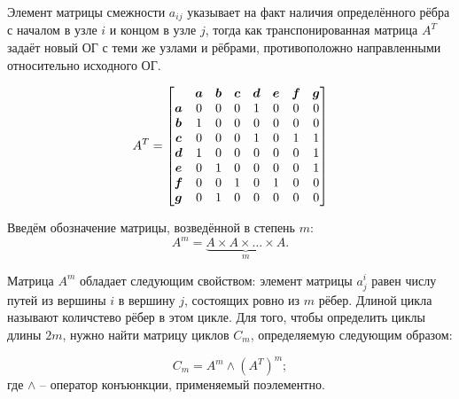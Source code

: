 Элемент матрицы смежности $a_{ij}$ указывает на факт наличия определённого рёбра с началом в узле $i$ и концом в узле $j$, тогда как транспонированная матрица $A^T$ задаёт новый ОГ с теми же узлами и рёбрами, противоположно направленными относительно исходного ОГ.

\begin{equation}\label{eq.rndhpcpar.2021.11.14.02}
	A^T=%
	\begin{bmatrix}
		&	\bs{a}	&	\bs{b}	&	\bs{c}	&	\bs{d}	&	\bs{e}	&	\bs{f}	&	\bs{g} \\
	\bs{a}	&	0	&	0	&	0	& 	1	& 	0	& 	0	 & 	0 \\
	\bs{b}	&	1	&	0	&	0	& 	0	& 	0	& 	0	 & 	0 \\
	\bs{c}	&	0	&	0	&	0	& 	1	& 	0	& 	1	 & 	1 \\
	\bs{d}	&	1	&	0	&	0	& 	0	& 	0	& 	0	 & 	1 \\
	\bs{e}	&	0	&	1	&	0	& 	0	& 	0	& 	0	 & 	1 \\
	\bs{f}	&	0	&	0	&	1	& 	0	& 	1	& 	0	 & 	0 \\
	\bs{g}	&	0	&	1	&	0	& 	0	& 	0	& 	0	 & 	0 \\
	\end{bmatrix}
	\end{equation}

Введём обозначение матрицы, возведённой в степень $m$:
\begin{equation}\label{eq.rndhpcpar.2021.11.14.03}
A^m=\underbrace{A\times A \times \ldots \times A}_{m}.
\end{equation}

Матрица $A^m$ обладает следующим свойством: элемент матрицы $a^i_j$ равен числу путей из вершины $i$ в вершину $j$, состоящих ровно из $m$ рёбер\cite{diestel2012graph}. Длиной цикла называют количстево рёбер в этом цикле. Для того, чтобы определить циклы длины $2m$, нужно найти матрицу циклов $C_m$, определяемую следующим образом: 

\begin{equation}\label{eq.rndhpcpar.2021.11.14.04}
    C_m = A^m \wedge (A^T)^m;
\end{equation}
где $\wedge$ -- оператор конъюнкции, применяемый поэлементно.


